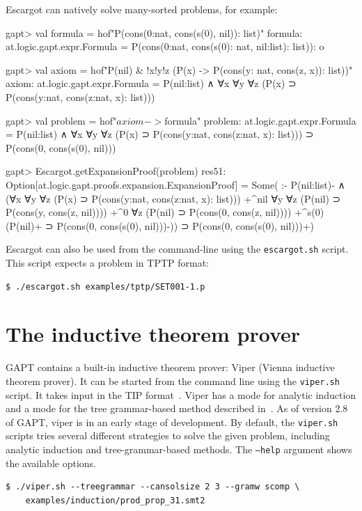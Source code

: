 \documentclass[a4paper,11pt]{book}
\newcommand{\cli}[1]{{\ttfamily {#1}}}
\begin{document}
Escargot can natively solve many-sorted problems, for example:
\begin{clilisting}
gapt> val formula = hof"P(cons(0:nat, cons(s(0), nil)): list)"
formula: at.logic.gapt.expr.Formula = P(cons(0:nat, cons(s(0): nat, nil:list): list)): o

gapt> val axiom = hof"P(nil) & !x!y!z (P(x) -> P(cons(y: nat, cons(z, x)): list))"
axiom: at.logic.gapt.expr.Formula = P(nil:list) ∧ ∀x ∀y ∀z (P(x) ⊃ P(cons(y:nat, cons(z:nat, x): list)))

gapt> val problem = hof"$axiom -> $formula"
problem: at.logic.gapt.expr.Formula =
P(nil:list) ∧ ∀x ∀y ∀z (P(x) ⊃ P(cons(y:nat, cons(z:nat, x): list))) ⊃
  P(cons(0, cons(s(0), nil)))

gapt> Escargot.getExpansionProof(problem)
res51: Option[at.logic.gapt.proofs.expansion.ExpansionProof] =
Some(
:-
P(nil:list)- ∧
    (∀x ∀y ∀z (P(x) ⊃ P(cons(y:nat, cons(z:nat, x): list)))
      +^{nil}
        ∀y ∀z (P(nil) ⊃ P(cons(y, cons(z, nil))))
        +^{0}
          ∀z (P(nil) ⊃ P(cons(0, cons(z, nil))))
          +^{s(0)} (P(nil)+ ⊃ P(cons(0, cons(s(0), nil)))-)) ⊃
  P(cons(0, cons(s(0), nil)))+)

\end{clilisting}


Escargot can also be used from the command-line using the \texttt{escargot.sh}
script.  This script expects a problem in TPTP format:
\begin{lstlisting}
$ ./escargot.sh examples/tptp/SET001-1.p
\end{lstlisting}

\section{The inductive theorem prover \cli{viper}}

GAPT contains a built-in inductive theorem prover: Viper (Vienna inductive theorem prover). It
can be started from the command line using the \texttt{viper.sh} script. It takes input in the
TIP format~\cite{Claessen15TIP}. Viper has a mode for analytic induction and a mode for 
the tree grammar-based method described in~\cite{Eberhard15Inductive}. As of version 2.8 of GAPT,
viper is in an early stage of development.  By default, the \texttt{viper.sh}
scripts tries several different strategies to solve the given problem,
including analytic induction and tree-grammar-based methods.  The
\texttt{--help} argument shows the available options.
\begin{lstlisting}
$ ./viper.sh --treegrammar --cansolsize 2 3 --gramw scomp \
    examples/induction/prod_prop_31.smt2
\end{lstlisting}
\end{document}
